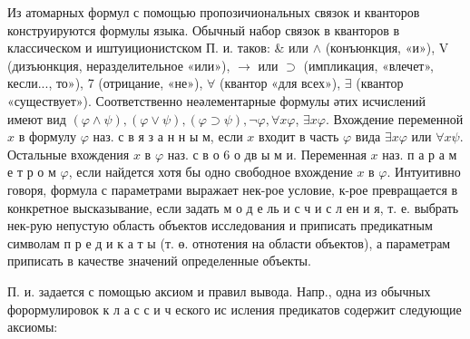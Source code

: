 \documentclass[10pt]{article}
\begin{document}
Из атомарных формул с помощью пропозичиональных связок и кванторов конструируются формулы языка. Обычный набор связок в кванторов в классическом и иштуиционистском П. и. таков: \& или $\wedge$ (конъюнкция, «и»), V (дизъюнкция, неразделительное «или»), $\rightarrow$ или $\supset$ (импликация, «влечет», кесли..., то»), 7 (отрицание, «не»), $\forall$ (квантор «для всех»), $\exists$ (квантор «существует»). Соответственно неәлементарные формулы әтих исчислений имеют вид $(\varphi \wedge \psi),(\varphi \vee \psi),(\varphi \supset \psi), \neg \varphi, \forall x \varphi$, $\exists x \varphi$. Вхождение переменной $x$ в формулу $\varphi$ наз. с в я з а н н ы м, если $x$ входит в часть $\varphi$ вида $\exists x \varphi$ или $\forall x \psi$. Остальные вхождения $x$ в $\varphi$ наз. с в о 6 о дв ы м и. Переменная $x$ наз. п а р а м е т р о м $\varphi$, если найдется хотя бы одно свободное вхождение $x$ в $\varphi$. Интуитивно говоря, формула с параметрами выражает нек-рое условие, к-рое превращается в конкретное высказывание, если задать м о д е ль и с ч и с л ен и я, т. е. выбрать нек-рую непустую область объектов исследования и приписать предикатным символам п р е д и к а т ы (т. ө. отнотения на области объектов), а параметрам приписать в качестве значений определенные объекты.



П. и. задается с помощью аксиом и правил вывода. Напр., одна из обычных форормулировок к л а с с и ч еского ис исления предикатов содержит следующие аксиомы:
\end{document}

